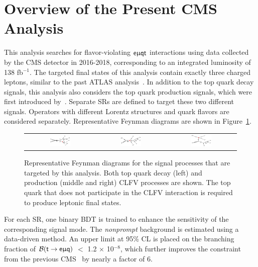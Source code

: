 \section{Overview of the Present CMS Analysis}
\label{sec:CLFV_This}

This analysis searches for flavor-violating $\textsf{e}\upmu\textsf{{q}t}$ interactions using data collected by the \ac{CMS} detector in 2016-2018, corresponding to an integrated luminosity of 138 fb$^{-1}$. The targeted final states of this analysis contain exactly three charged leptons, similar to the past \ac{ATLAS} analysis~\cite{ATLAS-CONF-2018-044}. In addition to the top quark decay signals, this analysis also considers the top quark production signals, which were first introduced by~\cite{CMS:2022ztx}. Separate \acp{SR} are defined to target these two different signals. Operators with different Lorentz structures and quark flavors are considered separately. Representative Feynman diagrams are shown in Figure~\ref{fig:CMS_FD_This}. 
 
\begin{figure}[tbh!]
 \begin{center}
 \begin{tabular}{ccc}
 \includegraphics[width=0.31\textwidth]{figures/Part3/History/TT}&
 \includegraphics[width=0.33\textwidth]{figures/Part3/History/ST1}&
 \includegraphics[width=0.31\textwidth]{figures/Part3/History/ST2}\\
 \end{tabular}
 \caption{Representative Feynman diagrams for the signal processes that are targeted by this analysis. Both top quark decay (left) and production (middle and right) \ac{CLFV} processes are shown. The top quark that does not participate in the \ac{CLFV} interaction is required to produce leptonic final states.}
 \label{fig:CMS_FD_This}
 \end{center}
 \end{figure}
 
For each \ac{SR}, one binary \ac{BDT} is trained to enhance the sensitivity of the corresponding signal mode. The \emph{nonprompt} background is estimated using a data-driven method. An upper limit at 95\% \ac{CL} is placed on the branching fraction of $\mathcal{B}(\textsf{t}\rightarrow\textsf{e}\upmu\textsf{q})$ $<$ 1.2 $\times$ 10$^{-8}$, which further improves the constraint from the previous \ac{CMS}~\cite{CMS:2022ztx} by nearly a factor of 6.